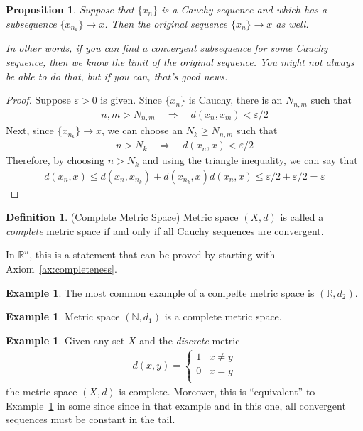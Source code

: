 \documentclass[12pt]{article}
\numberwithin{equation}{section} %
\theoremstyle{plain}
\newtheorem{prop}[thm]{Proposition}
\theoremstyle{definition}
\newtheorem{defn}[thm]{Definition}
\newtheorem{ex}[thm]{Example}
\theoremstyle{remark}
\newcommand{\R}{\mathbb{R}}
\newcommand{\N}{\mathbb{N}}
\begin{document}
\begin{prop}
\label{prop:cauchy-subseq}
Suppose that $\{x_n\}$ is a Cauchy sequence and which has a subsequence
$\{x_{n_k}\}\rightarrow x$. Then the original sequence
$\{x_n\}\rightarrow x$ as well.

In other words, if you can find a convergent subsequence for some Cauchy
sequence, then we know the limit of the original sequence. You might not
always be able to do that, but if you can, that's good news.
\end{prop}
\begin{proof}
Suppose $\varepsilon>0$ is given.  Since $\{x_n\}$ is Cauchy, there is
an $N_{n,m}$ such that
\begin{align*}
  n,m>N_{n,m}
  \quad\Rightarrow\quad
  d(x_n,x_m) <\varepsilon/2
\end{align*}
Next, since $\{x_{n_k}\}\rightarrow x$, we can choose an $N_k \geq
N_{n,m}$ such that
\begin{align*}
  n > N_k
  \quad\Rightarrow\quad
  d(x_n, x) < \varepsilon/2
\end{align*}
Therefore, by choosing $n>N_k$ and using the triangle inequality, we can
say that
\begin{align*}
  d(x_n,x) \leq d(x_n, x_{n_k}) + d(x_{n_k},x)
  d(x_n,x) \leq \varepsilon/2 + \varepsilon/2 = \varepsilon
\end{align*}
\end{proof}

\begin{defn}{(Complete Metric Space)}
Metric space $(X,d)$ is called a \emph{complete} metric space if and
only if all Cauchy sequences are convergent.

In $\R^n$, this is a statement that can be proved by starting
with Axiom~\ref{ax:completeness}.
\end{defn}

\begin{ex}
The most common example of a compelte metric space is
$(\R,d_2)$.
\end{ex}

\begin{ex}
\label{ex:Ncomplete}
Metric space $(\N,d_1)$ is a complete metric space.
\end{ex}

\begin{ex}
Given any set $X$ and the \emph{discrete} metric
\begin{align*}
  d(x,y) =
  \begin{cases}
    1 & x\neq y \\
    0 & x= y \\
  \end{cases}
\end{align*}
the metric space $(X,d)$ is complete.
Moreover, this is ``equivalent'' to Example~\ref{ex:Ncomplete} in some
since since in that example and in this one, all convergent sequences
must be constant in the tail.
\end{ex}
\end{document}
